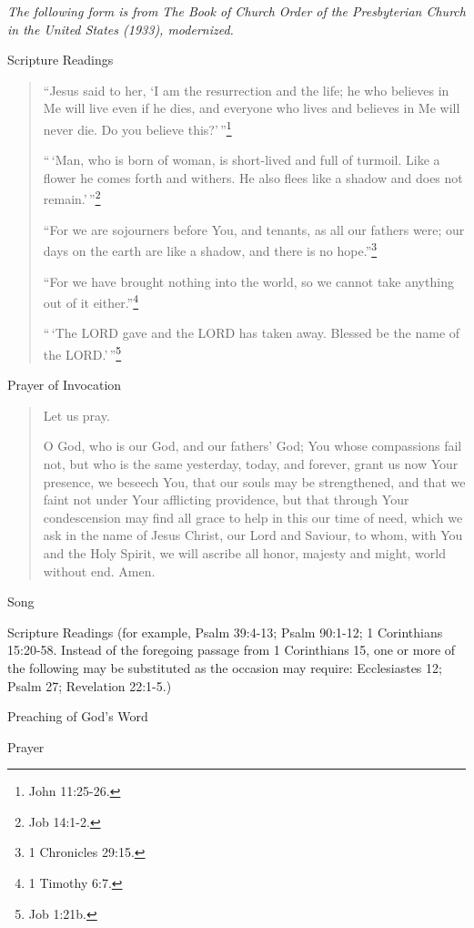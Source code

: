 \documentclass[
]{book}
\begin{document}
\emph{The following form is from The Book of Church Order of the Presbyterian Church in the United States (1933), modernized.}

Scripture Readings

\begin{quote}
``Jesus said to her, `I am the resurrection and the life; he who believes in Me will live even if he dies, and everyone who lives and believes in Me will never die. Do you believe this?'\,''\footnote{John 11:25-26.}

``\,`Man, who is born of woman, is short-lived and full of turmoil. Like a flower he comes forth and withers. He also flees like a shadow and does not remain.'\,''\footnote{Job 14:1-2.}

``For we are sojourners before You, and tenants, as all our fathers were; our days on the earth are like a shadow, and there is no hope.''\footnote{1 Chronicles 29:15.}

``For we have brought nothing into the world, so we cannot take anything out of it either.''\footnote{1 Timothy 6:7.}

``\,`The LORD gave and the LORD has taken away. Blessed be the name of the LORD.'\,''\footnote{Job 1:21b.}
\end{quote}

Prayer of Invocation

\begin{quote}
Let us pray.

O God, who is our God, and our fathers' God; You whose compassions fail not, but who is the same yesterday, today, and forever, grant us now Your presence, we beseech You, that our souls may be strengthened, and that we faint not under Your afflicting providence, but that through Your condescension may find all grace to help in this our time of need, which we ask in the name of Jesus Christ, our Lord and Saviour, to whom, with You and the Holy Spirit, we will ascribe all honor, majesty and might, world without end. Amen.
\end{quote}

Song

Scripture Readings (for example, Psalm 39:4-13; Psalm 90:1-12; 1 Corinthians 15:20-58. Instead of the foregoing passage from 1 Corinthians 15, one or more of the following may be substituted as the occasion may require: Ecclesiastes 12; Psalm 27; Revelation 22:1-5.)

Preaching of God's Word

Prayer
\end{document}
